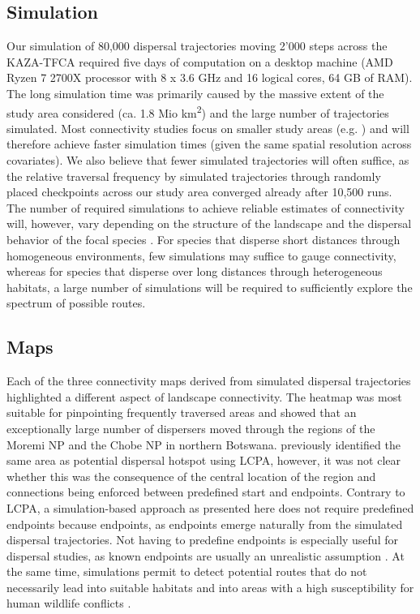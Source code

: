 \documentclass[abstract=on,10pt,a4paper,bibliography=totocnumbered]{article}
\begin{document}
\subsection{Simulation}
Our simulation of 80,000 dispersal trajectories moving 2'000 steps across the
KAZA-TFCA required five days of computation on a desktop machine (AMD Ryzen 7
2700X processor with 8 x 3.6 GHz and 16 logical cores, 64 GB of RAM). The long
simulation time was primarily caused by the massive extent of the study area
considered (ca. 1.8 Mio km\textsuperscript{2}) and the large number of
trajectories simulated. Most connectivity studies focus on smaller study areas
(e.g. \citealp{Kanagaraj.2013, Clark.2015, McClure.2016, Abrahms.2017,
Zeller.2020}) and will therefore achieve faster simulation times (given the same
spatial resolution across covariates). We also believe that fewer simulated
trajectories will often suffice, as the relative traversal frequency by
simulated trajectories through randomly placed checkpoints across our study area
converged already after 10,500 runs. The number of required simulations to
achieve reliable estimates of connectivity will, however, vary depending on the
structure of the landscape and the dispersal behavior of the focal species
\citep{Gustafson.1996}. For species that disperse short distances through
homogeneous environments, few simulations may suffice to gauge connectivity,
whereas for species that disperse over long distances through heterogeneous
habitats, a large number of simulations will be required to sufficiently explore
the spectrum of possible routes.

\subsection{Maps}
Each of the three connectivity maps derived from simulated dispersal
trajectories highlighted a different aspect of landscape connectivity. The
heatmap was most suitable for pinpointing frequently traversed areas and showed
that an exceptionally large number of dispersers moved through the regions of
the Moremi NP and the Chobe NP in northern Botswana. \citep{Hofmann.2021}
previously identified the same area as potential dispersal hotspot using LCPA,
however, it was not clear whether this was the consequence of the central
location of the region and connections being enforced between predefined start
and endpoints. Contrary to LCPA, a simulation-based approach as presented here
does not require predefined endpoints because endpoints, as endpoints emerge
naturally from the simulated dispersal trajectories. Not having to predefine
endpoints is especially useful for dispersal studies, as known endpoints are
usually an unrealistic assumption \citep{Elliot.2014, Abrahms.2017, Cozzi.2020}.
At the same time, simulations permit to detect potential routes that do not
necessarily lead into suitable habitats \citep{Dwernychuk.1972, VanDerMeer.2014}
and into areas with a high susceptibility for human wildlife conflicts
\citep{Cushman.2018}.
\end{document}
